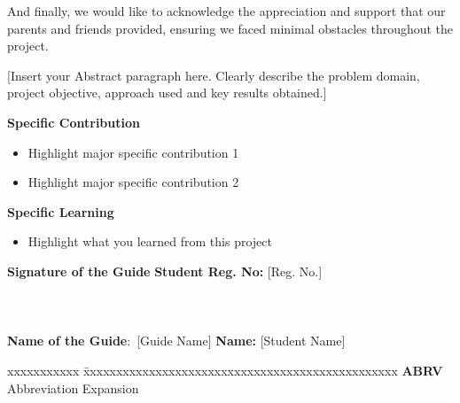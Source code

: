 \documentclass[a4paper, 12pt, oneside]{sastra}
\begin{document}
\par And finally, we would like to acknowledge the appreciation and support that our parents and friends provided, ensuring we faced minimal obstacles throughout the project.

	\pagebreak
	
	\abstract
	
	\vspace*{12pt}
	
[Insert your Abstract paragraph here. Clearly describe the problem domain, project objective, approach used and key results obtained.]
	
	\noindent \textbf{Specific Contribution}
	\begin{itemize}
		\item Highlight major specific contribution 1
		\item Highlight major specific contribution 2
	\end{itemize}
	\noindent \textbf{Specific Learning}
	\begin{itemize}
		\item Highlight what you learned from this project
	\end{itemize}
	
	\vspace*{12pt}
	
	\noindent \textbf{Signature of the Guide} \hfill \textbf{Student Reg. No:} [Reg. No.]\\
		\\
	\\
	\\
\noindent \textbf{Name of the Guide}:~[Guide Name] \hfill \textbf{Name:} [Student Name]
\pagebreak
	
	\begin{singlespace}
		\tableofcontents
		\thispagestyle{empty}
		
		\listoffigures
		\listoftables
	\end{singlespace}
	
	
	\abbreviations
	
	\noindent 
	\begin{tabbing}
		xxxxxxxxxxx \= xxxxxxxxxxxxxxxxxxxxxxxxxxxxxxxxxxxxxxxxxxxxxxxx \kill
		\textbf{ABRV}   \> Abbreviation Expansion \\
	\end{tabbing}
	
\end{document}
